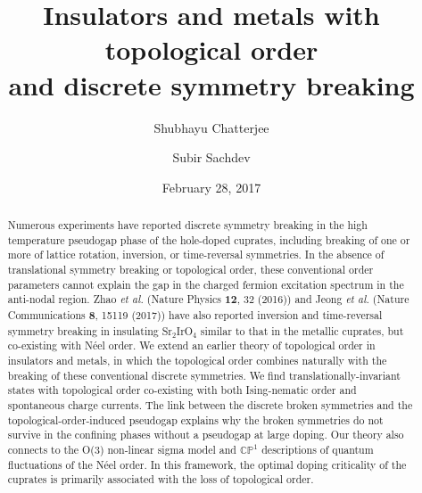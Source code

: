 \documentclass[aps,prb,preprint,onecolumn,citeautoscript,superscriptaddress,footinbib,
eqsecnum]{revtex4-1}
\begin{document}
\title{Insulators and metals with topological order\\ and discrete symmetry breaking}

\author{Shubhayu Chatterjee}


\author{Subir Sachdev}


\date{February 28, 2017 
\\
\vspace{0.4in}}

\begin{abstract}
Numerous experiments have reported discrete symmetry breaking in the high temperature pseudogap phase of the hole-doped cuprates,
including breaking of one or more of lattice rotation, inversion, or time-reversal symmetries. In the absence of translational symmetry breaking or
topological order, these
conventional order parameters cannot explain the gap in the charged fermion excitation spectrum in the anti-nodal region.
Zhao {\em et al.\/} (Nature Physics {\bf 12}, 32 (2016)) and Jeong {\em et al.\/} (Nature Communications {\bf 8}, 15119 (2017))
have also reported inversion and time-reversal symmetry breaking in insulating 
Sr$_2$IrO$_4$ similar to that in the metallic cuprates, but co-existing with N\'eel order. 
We extend an earlier theory of topological order in insulators and metals, in which 
the  topological order combines naturally with the breaking of these conventional
discrete symmetries. We find translationally-invariant states with topological order co-existing with both
Ising-nematic order and spontaneous charge currents. The link between the discrete broken symmetries and the topological-order-induced pseudogap explains why the broken symmetries do not survive in the confining phases without a pseudogap at large doping.
Our theory also connects to the O(3) non-linear sigma model and $\mathbb{CP}^1$ descriptions of quantum fluctuations of the N\'eel order.
In this framework, the optimal doping criticality of the cuprates is primarily associated with the loss of topological order.
\end{abstract}
\maketitle


\end{document}
